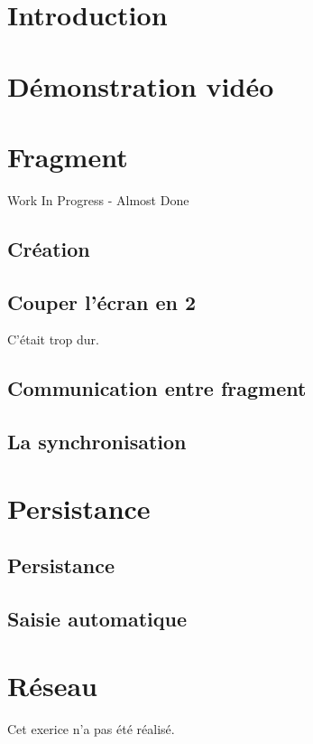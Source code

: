 \documentclass[a4paper]{article}
\begin{document}
    \newpage
    \begin{multicols}{2}
        \section*{Introduction}
        \section*{Démonstration vidéo}

        \section{Fragment}
            Work In Progress - Almost Done
            \subsection{Création}
            \subsection{Couper l'écran en 2}
                C'était trop dur.
            \subsection{Communication entre fragment}
            \subsection{La synchronisation}
        \section{Persistance}
            \subsection{Persistance}
            \subsection{Saisie automatique}
        \section{Réseau}
            Cet exerice n'a pas été réalisé.

\end{multicols}
\end{document}
